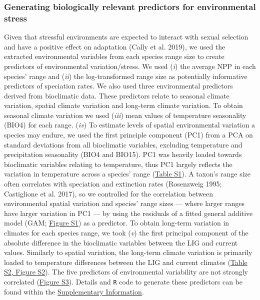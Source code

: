 \documentclass[]{article}
\begin{document}
\hypertarget{generating-biologically-relevant-predictors-for-environmental-stress}{%
\subsubsection{Generating biologically relevant predictors for
environmental
stress}\label{generating-biologically-relevant-predictors-for-environmental-stress}}

Given that stressful environments are expected to interact with sexual
selection and have a positive effect on adaptation (Cally et al. 2019),
we used the extracted environmental variables from each species range
size to create predictors of environmental variation/stress. We used
(\emph{i}) the average NPP in each species' range and (\emph{ii}) the
log-transformed range size as potentially informative predictors of
speciation rates. We also used three environmental predictors derived
from bioclimatic data. These predictors relate to seasonal climate
variation, spatial climate variation and long-term climate variation. To
obtain seasonal climate variation we used (\emph{iii}) mean values of
temperature seasonality (BIO4) for each range. (\emph{iv}) To estimate
levels of spatial environmental variation a species may endure, we used
the first principle component (PC1) from a PCA on standard deviations
from all bioclimatic variables, excluding temperature and precipitation
seasonality (BIO4 and BIO15). PC1 was heavily loaded towards bioclimatic
variables relating to temperature, thus PC1 largely reflects the
variation in temperature across a species' range
(\href{https://justincally.github.io/SexualSelection_Speciation/#generating_biologically_relevent_predictors}{Table S1}).
A taxon's range size often correlates with speciation and extinction
rates (Rosenzweig 1995; Castiglione et al. 2017), so we controlled for
the correlation between environmental spatial variation and species'
range sizes --- where larger ranges have larger variation in PC1 --- by
using the residuals of a fitted general additive model (GAM;
\href{https://justincally.github.io/SexualSelection_Speciation/#generating_biologically_relevent_predictors}{Figure S1})
as a predictor. To obtain long-term variation in climates for each
species range, we took (\emph{v}) the first principal component of the
absolute difference in the bioclimatic variables between the LIG and
current values. Similarly to spatial variation, the long-term climate
variation is primarily loaded to temperature differences between the LIG
and current climates
(\href{https://justincally.github.io/SexualSelection_Speciation/#long_term_climate_variability_(lig_anomaly)}{Table S2, Figure S2}).
The five predictors of environmental variability are not strongly
correlated
(\href{https://justincally.github.io/SexualSelection_Speciation/#correlations_between_environmental_predictors}{Figure S3}).
Details and \texttt{R} code to generate these predictors can be found
within the
\href{https://justincally.github.io/SexualSelection_Speciation/}{Supplementary Information}.
\end{document}
